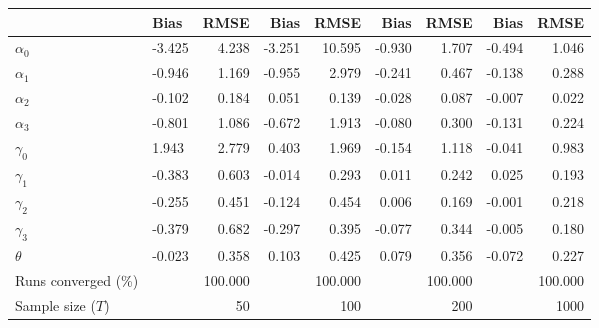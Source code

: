 
\begin{tabular}[t]{llrrrrrrr}
\toprule
  & Bias & RMSE & Bias & RMSE & Bias & RMSE & Bias & RMSE\\
\midrule
$\alpha_{0}$ & -3.425 & 4.238 & -3.251 & 10.595 & -0.930 & 1.707 & -0.494 & 1.046\\
$\alpha_{1}$ & -0.946 & 1.169 & -0.955 & 2.979 & -0.241 & 0.467 & -0.138 & 0.288\\
$\alpha_{2}$ & -0.102 & 0.184 & 0.051 & 0.139 & -0.028 & 0.087 & -0.007 & 0.022\\
$\alpha_{3}$ & -0.801 & 1.086 & -0.672 & 1.913 & -0.080 & 0.300 & -0.131 & 0.224\\
$\gamma_{0}$ & 1.943 & 2.779 & 0.403 & 1.969 & -0.154 & 1.118 & -0.041 & 0.983\\
$\gamma_{1}$ & -0.383 & 0.603 & -0.014 & 0.293 & 0.011 & 0.242 & 0.025 & 0.193\\
$\gamma_{2}$ & -0.255 & 0.451 & -0.124 & 0.454 & 0.006 & 0.169 & -0.001 & 0.218\\
$\gamma_{3}$ & -0.379 & 0.682 & -0.297 & 0.395 & -0.077 & 0.344 & -0.005 & 0.180\\
$\theta$ & -0.023 & 0.358 & 0.103 & 0.425 & 0.079 & 0.356 & -0.072 & 0.227\\
Runs converged (\%) &  & 100.000 &  & 100.000 &  & 100.000 &  & 100.000\\
Sample size ($T$) &  & 50 &  & 100 &  & 200 &  & 1000\\
\bottomrule
\end{tabular}
